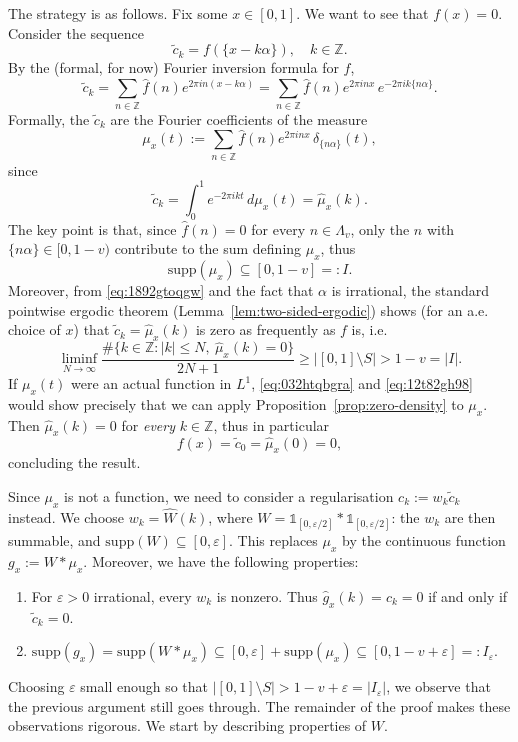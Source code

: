 \documentclass[reqno,a4paper,12pt]{amsart}
\numberwithin{equation}{section}
\def\Z{{\mathbb Z}}
\newcommand{\supp}{{\mathrm{supp}}}
\newcommand\1{\mathds{1}}
\begin{document}
The strategy is as follows.  Fix some $x\in[0,1]$. We want to see
that $f(x)=0$. Consider the sequence
\begin{equation}\label{eq:1892gtoqgw}
     \widetilde c_k=f(\{x-k\alpha\}),\quad k\in\Z .
\end{equation}
By the (formal, for now) Fourier inversion formula for $f$,
\[
 \widetilde c_k=\sum_{n\in\Z}\widehat f(n)e^{2\pi i n(x-k\alpha)}
    =\sum_{n\in\Z}\widehat f(n)e^{2\pi i nx}\,e^{-2\pi i k\{n\alpha\}}.
\]
Formally, the $\widetilde c_k$ are the Fourier coefficients of the measure
\[
 \mu_x(t):=\sum_{n\in\Z}\widehat f(n)e^{2\pi i nx}\,\delta_{\{n\alpha\}}(t),
\]
since
\[
 \widetilde c_k=\int_0^1e^{-2\pi i kt}\, d\mu_x(t)=\widehat \mu_x(k).
\]
The key point is that, since $\widehat f(n)=0$ for every $n\in\Lambda_v$, only the $n$ with
$\{n\alpha\}\in[0,1-v)$ contribute to the sum defining $\mu_x$, thus
\begin{equation}\label{eq:032htqbgra}
    \supp(\mu_x)\subseteq [0,1-v]=:I.
\end{equation}
Moreover, from \eqref{eq:1892gtoqgw} and the fact that $\alpha$ is
irrational, the standard pointwise ergodic theorem
(Lemma~\ref{lem:two-sided-ergodic}) shows (for an a.e. choice of $x$) that
$\widetilde c_k=\widehat \mu_x(k)$ is zero as frequently as $f$ is, i.e.
\begin{equation}\label{eq:12t82gh98}
 \liminf_{N\to\infty}
 \frac{\#\{k\in\Z:|k|\leq N,\ \widehat \mu_x(k)=0\}}{2N+1}\geq |[0,1]\setminus S|>1-v=|I| .
\end{equation}
If $\mu_x(t)$ were an actual function in $L^1$, \eqref{eq:032htqbgra}
and \eqref{eq:12t82gh98} would show precisely that we can apply
Proposition~\ref{prop:zero-density} to $\mu_x$.  Then
$\widehat \mu_x(k)=0$ for {\it every} $k\in\Z$, thus in particular
\[
 f(x)=\widetilde c_0=\widehat \mu_x(0)=0,
\]
concluding the result.

Since $\mu_x$ is not a function, we need to consider a regularisation $c_k:=w_k \widetilde c_k$ instead. We choose $w_k=\widehat W(k)$, where $W=\1_{[0,\varepsilon/2]}*\1_{[0,\varepsilon/2]}$: the $w_k$ are then summable, and $\supp (W)\subseteq [0,\varepsilon]$. This replaces $\mu_x$ by the continuous function $g_x:=W*\mu_x$. Moreover, we have the following properties:
\begin{enumerate}
    \item For $\varepsilon>0$ irrational, every
$w_k$ is nonzero. Thus $\widehat g_x(k)=c_k=0$  if and only if $\widetilde c_k=0$.
\item $\supp (g_x)=\supp (W*\mu_x)\subseteq [0,\varepsilon]+\supp (\mu_x)\subseteq[0, 1-v+\varepsilon]=:I_\varepsilon$.
\end{enumerate}
Choosing
$\varepsilon$ small enough so that $|[0,1]\setminus S|>1-v+\varepsilon=|I_\varepsilon|$, we observe that the previous argument still goes through.
The remainder of the proof makes these observations rigorous. We start by describing properties of $W$.
\end{document}

